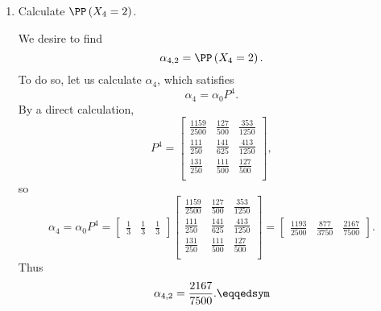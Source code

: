 \documentclass[stat333]{subfiles}
\begin{document}
\begin{enumerate}
        \item Calculate $\PP\left( X_4=2 \right)$.

            \begin{subproof}[Answer]
                We desire to find
                \begin{equation*}
                    \alpha_{4,2} = \PP\left( X_4=2 \right).
                \end{equation*}
                To do so, let us calculate $\alpha_4$, which satisfies
                \begin{equation*}
                    \alpha_4 = \alpha_0P^4.
                \end{equation*}
                By a direct calculation,
                \begin{equation*}
                    P^4 = 
                    \begin{bmatrix}
                    	\frac{1159}{2500} & \frac{127}{500} & \frac{353}{1250} \\
                    	\frac{111}{250} & \frac{141}{625} & \frac{413}{1250} \\
                    	\frac{131}{250} & \frac{111}{500} & \frac{127}{500} \\
                    \end{bmatrix},
                \end{equation*}
                so
                \begin{equation*}
                    \alpha_4 = \alpha_0P^4 = \begin{bmatrix} \frac{1}{3} & \frac{1}{3} & \frac{1}{3} \end{bmatrix}
                    \begin{bmatrix}
                    	\frac{1159}{2500} & \frac{127}{500} & \frac{353}{1250} \\
                    	\frac{111}{250} & \frac{141}{625} & \frac{413}{1250} \\
                    	\frac{131}{250} & \frac{111}{500} & \frac{127}{500} \\
                    \end{bmatrix}
                    =
                    \begin{bmatrix} \frac{1193}{2500} & \frac{877}{3750} & \frac{2167}{7500} \end{bmatrix}.
                \end{equation*}
                Thus
                \begin{equation*}
                    \alpha_{4,2} = \frac{2167}{7500}. \eqqedsym
                \end{equation*}
            \end{subproof}


\end{enumerate}
\end{document}

